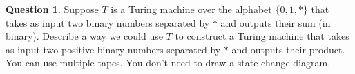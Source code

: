 \documentclass{article}
\theoremstyle{definition}
\newtheorem{Q}{Question}
\begin{document}
\begin{Q}
Suppose $T$ is a Turing machine over the alphabet $\{0,1,*\}$ that takes as input two binary numbers separated by $*$ and outputs their sum (in binary). Describe a way we could use $T$ to construct a Turing machine that takes as input two positive binary numbers separated by $*$ and outputs their product. You can use multiple tapes. You don't need to draw a state change diagram.
\end{Q}

\end{document}
